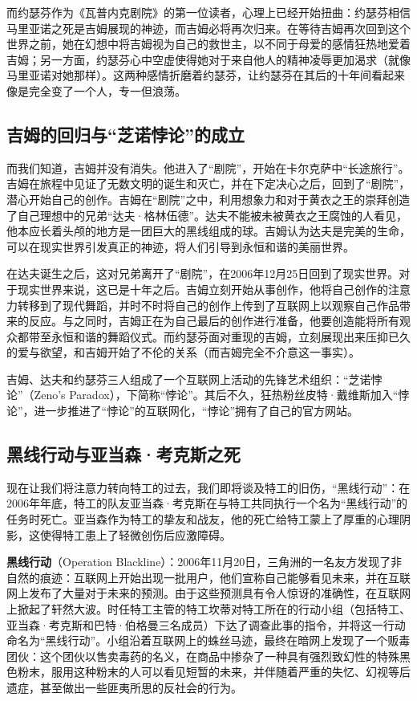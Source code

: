 而约瑟芬作为《瓦普内克剧院》的第一位读者，心理上已经开始扭曲：约瑟芬相信马里亚诺之死是吉姆展现的神迹，而吉姆必将再次归来。在等待吉姆再次回到这个世界之前，她在幻想中将吉姆视为自己的救世主，以不同于母爱的感情狂热地爱着吉姆；另一方面，约瑟芬心中空虚使得她对于来自他人的精神凌辱更加渴求（就像马里亚诺对她那样）。这两种感情折磨着约瑟芬，让约瑟芬在其后的十年间看起来像是完全变了一个人，专一但浪荡。

\subsection{吉姆的回归与“芝诺悖论”的成立}

而我们知道，吉姆并没有消失。他进入了“剧院”，开始在卡尔克萨中“长途旅行”。吉姆在旅程中见证了无数文明的诞生和灭亡，并在下定决心之后，回到了“剧院”，潜心开始自己的创作。吉姆在“剧院”之中，利用想象力和对于黄衣之王的崇拜创造了自己理想中的兄弟“达夫·格林伍德”。达夫不能被未被黄衣之王腐蚀的人看见，他本应长着头颅的地方是一团巨大的黑线组成的球。吉姆认为达夫是完美的生命，可以在现实世界引发真正的神迹，将人们引导到永恒和谐的美丽世界。

在达夫诞生之后，这对兄弟离开了“剧院”，在2006年12月25日回到了现实世界。对于现实世界来说，这已是十年之后。吉姆立刻开始从事创作，他将自己创作的注意力转移到了现代舞蹈，并时不时将自己的创作上传到了互联网上以观察自己作品带来的反应。与之同时，吉姆正在为自己最后的创作进行准备，他要创造能将所有观众都带至永恒和谐的舞蹈仪式。而约瑟芬面对重现的吉姆，立刻展现出来压抑已久的爱与欲望，和吉姆开始了不伦的关系（而吉姆完全不介意这一事实）。

吉姆、达夫和约瑟芬三人组成了一个互联网上活动的先锋艺术组织：“芝诺悖论”（Zeno's Paradox），下简称“悖论”。其后不久，狂热粉丝皮特·戴维斯加入“悖论”，进一步推进了“悖论”的互联网化，“悖论”拥有了自己的官方网站。

\subsection{黑线行动与亚当森·考克斯之死}

现在让我们将注意力转向特工的过去，我们即将谈及特工的旧伤，“黑线行动”：在2006年年底，特工的队友亚当森·考克斯在与特工共同执行一个名为“黑线行动”的任务时死亡。亚当森作为特工的挚友和战友，他的死亡给特工蒙上了厚重的心理阴影，这使得特工患上了轻微创伤后应激障碍。

\textbf{黑线行动}（Operation Blackline）：2006年11月20日，三角洲的一名友方发现了非自然的痕迹：互联网上开始出现一批用户，他们宣称自己能够看见未来，并在互联网上发布了大量对于未来的预测。由于这些预测具有令人惊讶的准确性，在互联网上掀起了轩然大波。时任特工主管的特工坎蒂对特工所在的行动小组（包括特工、亚当森·考克斯和巴特·伯格曼三名成员）下达了调查此事的指令，并将这一行动命名为“黑线行动”。小组沿着互联网上的蛛丝马迹，最终在暗网上发现了一个贩毒团伙：这个团伙以售卖毒药的名义，在商品中掺杂了一种具有强烈致幻性的特殊黑色粉末，服用这种粉末的人可以看见短暂的未来，并伴随着严重的失忆、幻视等后遗症，甚至做出一些匪夷所思的反社会的行为。

